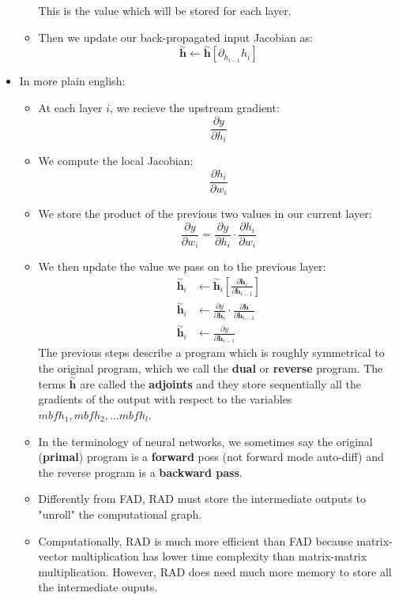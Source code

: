 \documentclass{article}
\newcommand{\tbf}[1]{\textbf{#1}}
\newcommand{\mbf}[1]{\mathbf{#1}}
\begin{document}
\begin{itemize}
\begin{itemize}
        This is the value which will be stored for each layer. 
        \item Then we update our back-propagated input Jacobian as:
        \[\overset{\sim}{\mbf{h}} \leftarrow \overset{\sim}{\mbf{h}} \left[ \partial_{h_{i-1}} h_i \right]\]
    \end{itemize}
    \item In more plain english:
    \begin{itemize}
        \item At each layer $i$, we recieve the upstream gradient:
        \[ \frac{\partial y}{\partial h_{i}} \]
        \item We compute the local Jacobian: 
        \[ \frac{\partial h_{i}}{\partial w_{i}} \]
        \item We store the product of the previous two values in our current layer: 
        \[\frac{\partial y}{\partial w_i} = \frac{\partial y}{\partial h_i} \cdot \frac{\partial h_i}{\partial w_i}\]
        \item We then update the value we pass on to the previous layer:
        \begin{align*}
            \overset{\sim}{\mbf{h}}_i &\leftarrow \overset{\sim}{\mbf{h}}_i \left[ \frac{\partial \mbf{h}_i}{\partial \mbf{h}_{i-1}} \right] \\
            \overset{\sim}{\mbf{h}}_i &\leftarrow \frac{\partial y}{\partial \mbf{h}_i} \cdot \frac{\partial \mbf{h}}{\partial \mbf{h}_{i-1}} \\
            \overset{\sim}{\mbf{h}}_i &\leftarrow \frac{\partial y}{\partial \mbf{h}_{i-1}} 
        \end{align*}
        The previous steps describe a program which is roughly symmetrical to the original program, which we call the \tbf{dual} or \tbf{reverse} program.
        The terms $\overset{\sim}{\mbf{h}}$ are called the \tbf{adjoints} and they store sequentially all the gradients of the output with respect to the variables $mbf{h}_1, mbf{h}_2, \hdots mbf{h}_l$.
        \item In the terminology of neural networks, we sometimes say the original (\tbf{primal}) program is a \tbf{forward} poss (not forward mode auto-diff) and the reverse program is a \tbf{backward pass}.
        \item Differently from FAD, RAD must store the intermediate outputs to "unroll" the computational graph. 
        \item Computationally, RAD is much more efficient than FAD because matrix-vector multiplication has lower time complexity than matrix-matrix multiplication. However, RAD does need much more memory to store all the intermediate ouputs. 

\end{itemize}
\end{itemize}
\end{document}

